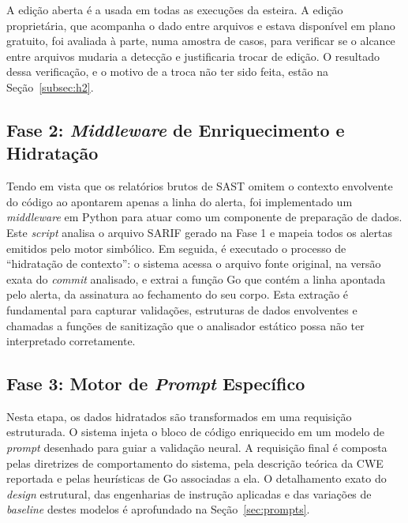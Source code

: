 A edição aberta é a usada em todas as execuções da esteira. A edição proprietária, que acompanha o dado entre arquivos e estava disponível em plano gratuito, foi avaliada à parte, numa amostra de casos, para verificar se o alcance entre arquivos mudaria a detecção e justificaria trocar de edição. O resultado dessa verificação, e o motivo de a troca não ter sido feita, estão na Seção~\ref{subsec:h2}.

\subsection{Fase 2: \textit{Middleware} de Enriquecimento e Hidratação}
Tendo em vista que os relatórios brutos de SAST omitem o contexto envolvente do código ao apontarem apenas a linha do alerta, foi implementado um \textit{middleware} em Python para atuar como um componente de preparação de dados. Este \textit{script} analisa o arquivo SARIF gerado na Fase 1 e mapeia todos os alertas emitidos pelo motor simbólico. Em seguida, é executado o processo de ``hidratação de contexto'': o sistema acessa o arquivo fonte original, na versão exata do \textit{commit} analisado, e extrai a função Go que contém a linha apontada pelo alerta, da assinatura ao fechamento do seu corpo. Esta extração é fundamental para capturar validações, estruturas de dados envolventes e chamadas a funções de sanitização que o analisador estático possa não ter interpretado corretamente. 

\subsection{Fase 3: Motor de \textit{Prompt} Específico}
Nesta etapa, os dados hidratados são transformados em uma requisição estruturada. O sistema injeta o bloco de código enriquecido em um modelo de \textit{prompt} desenhado para guiar a validação neural. A requisição final é composta pelas diretrizes de comportamento do sistema, pela descrição teórica da CWE reportada e pelas heurísticas de Go associadas a ela. O detalhamento exato do \textit{design} estrutural, das engenharias de instrução aplicadas e das variações de \textit{baseline} destes modelos é aprofundado na Seção~\ref{sec:prompts}.

